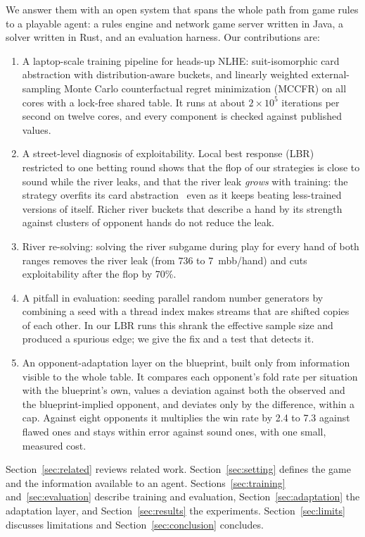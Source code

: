 \documentclass{ieeeaccess}
\newcommand{\mbb}{mbb/hand}
\begin{document}
We answer them with an open system that spans the whole path from game rules to a playable
agent: a rules engine and network game server written in Java, a solver written in Rust, and an
evaluation harness. Our contributions are:
\begin{enumerate}
\item A laptop-scale training pipeline for heads-up NLHE: suit-isomorphic card abstraction with
distribution-aware buckets, and linearly weighted external-sampling Monte Carlo counterfactual
regret minimization (MCCFR) on all cores with a lock-free shared table. It runs at about
$2\times10^5$ iterations per second on twelve cores, and every component is checked against
published values.
\item A street-level diagnosis of exploitability. Local best response (LBR)~\cite{lisy2017}
restricted to one betting round shows that the flop of our strategies is close to sound while
the river leaks, and that the river leak \emph{grows} with training: the strategy overfits its
card abstraction~\cite{waugh2009,johanson2013} even as it keeps beating less-trained versions
of itself. Richer river buckets that describe a hand by its strength against clusters of
opponent hands do not reduce the leak.
\item River re-solving: solving the river subgame during play for every hand of both ranges
removes the river leak (from 736 to 7~\mbb) and cuts exploitability after the flop by 70\%.
\item A pitfall in evaluation: seeding parallel random number generators by combining a seed
with a thread index makes streams that are shifted copies of each other. In our LBR runs this
shrank the effective sample size and produced a spurious edge; we give the fix and a test that
detects it.
\item An opponent-adaptation layer on the blueprint, built only from information visible to the
whole table. It compares each opponent's fold rate per situation with the blueprint's own, values
a deviation against both the observed and the blueprint-implied opponent, and deviates only by the
difference, within a cap. Against eight opponents it multiplies the win rate by 2.4 to 7.3
against flawed ones and stays within error against sound ones, with one small, measured cost.
\end{enumerate}

Section~\ref{sec:related} reviews related work. Section~\ref{sec:setting} defines the game and
the information available to an agent. Sections~\ref{sec:training} and~\ref{sec:evaluation}
describe training and evaluation, Section~\ref{sec:adaptation} the adaptation layer, and
Section~\ref{sec:results} the experiments. Section~\ref{sec:limits} discusses limitations and
Section~\ref{sec:conclusion} concludes.
\end{document}
